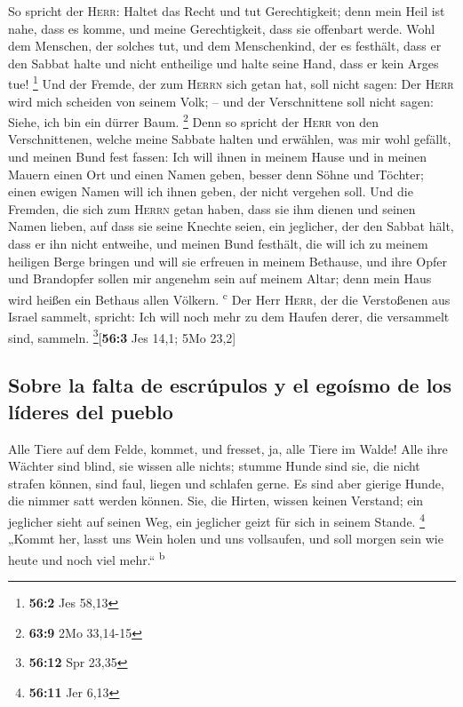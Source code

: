  So spricht der \textsc{Herr}: Haltet das Recht und tut
Gerechtigkeit; denn mein Heil ist nahe, dass es komme, und meine
Gerechtigkeit, dass sie offenbart werde.  Wohl dem
Menschen, der solches tut, und dem Menschenkind, der es festhält, dass
er den Sabbat halte und nicht entheilige und halte seine Hand, dass er
kein Arges tue! \footnote{\textbf{56:2} Jes 58,13}  Und
der Fremde, der zum \textsc{Herrn} sich getan hat, soll nicht sagen: Der
\textsc{Herr} wird mich scheiden von seinem Volk; -- und der
Verschnittene soll nicht sagen: Siehe, ich bin ein dürrer Baum.
\footnote{\textbf{63:9} 2Mo 33,14-15}  Denn so spricht der
\textsc{Herr} von den Verschnittenen, welche meine Sabbate halten und
erwählen, was mir wohl gefällt, und meinen Bund fest fassen:
 Ich will ihnen in meinem Hause und in meinen Mauern einen
Ort und einen Namen geben, besser denn Söhne und Töchter; einen ewigen
Namen will ich ihnen geben, der nicht vergehen soll.  Und
die Fremden, die sich zum \textsc{Herrn} getan haben, dass sie ihm
dienen und seinen Namen lieben, auf dass sie seine Knechte seien, ein
jeglicher, der den Sabbat hält, dass er ihn nicht entweihe, und meinen
Bund festhält,  die will ich zu meinem heiligen Berge
bringen und will sie erfreuen in meinem Bethause, und ihre Opfer und
Brandopfer sollen mir angenehm sein auf meinem Altar; denn mein Haus
wird heißen ein Bethaus allen Völkern. \textsuperscript{c}
 Der Herr \textsc{Herr}, der die Verstoßenen aus Israel
sammelt, spricht: Ich will noch mehr zu dem Haufen derer, die versammelt
sind, sammeln. \footnote{\textbf{56:12} Spr 23,35}{[}\textbf{56:3} Jes
14,1; 5Mo 23,2{]}

\hypertarget{sobre-la-falta-de-escruxfapulos-y-el-egouxedsmo-de-los-luxedderes-del-pueblo}{%
\subsection{Sobre la falta de escrúpulos y el egoísmo de los líderes del
pueblo}\label{sobre-la-falta-de-escruxfapulos-y-el-egouxedsmo-de-los-luxedderes-del-pueblo}}

 Alle Tiere auf dem Felde, kommet, und fresset, ja, alle
Tiere im Walde!  Alle ihre Wächter sind blind, sie wissen
alle nichts; stumme Hunde sind sie, die nicht strafen können, sind faul,
liegen und schlafen gerne.  Es sind aber gierige Hunde,
die nimmer satt werden können. Sie, die Hirten, wissen keinen Verstand;
ein jeglicher sieht auf seinen Weg, ein jeglicher geizt für sich in
seinem Stande. \footnote{\textbf{56:11} Jer 6,13}  „Kommt
her, lasst uns Wein holen und uns vollsaufen, und soll morgen sein wie
heute und noch viel mehr.`` \textsuperscript{b}

